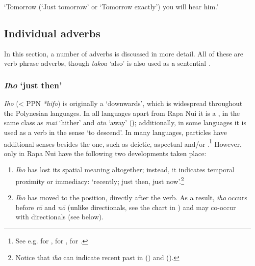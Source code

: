 \glt 
‘Tomorrow (‘Just tomorrow’ or ‘Tomorrow exactly’) you will hear him.’ \textstyleExampleref{[Act. 25:22]}
\z

\subsection{Individual adverbs}\label{sec:4.5.3}
In this section, a number of adverbs is discussed in more detail. All of these are verb phrase adverbs, though \textit{tako{\ꞌ}a} ‘also’ is also used as a sentential .

\subsubsection{\textit{Iho} ‘just then’}\label{sec:4.5.3.1}

\textit{Iho} ({\textless} PPN \textit{*hifo}) is originally a   ‘downwards’, which is widespread throughout the Polynesian languages. In all languages apart from Rapa Nui it is a , in the same class as \textit{mai} ‘hither’ and \textit{atu} ‘away’ (); additionally, in some languages it is used as a verb in the sense ‘to descend’. In many languages,  particles have additional senses besides the  one, such as deictic, aspectual and/or .\footnote{\label{fn:194}See e.g. \citet[427]{Cablitz2006} for , \citet[175, 217, 330]{AcadémieTahitienne1986} for , \citet[92–95]{ElbertPukui1979} for .} However, only in Rapa Nui have the following two developments taken place: 

\begin{enumerate}
\item 
\textit{Iho} has lost its spatial meaning altogether; instead, it indicates temporal proximity or immediacy: ‘recently; just then, just now’.\footnote{\label{fn:195}Notice that \textit{iho} can indicate recent past in  (\citealt[92]{ElbertPukui1979}) and  (\citealt[175]{AcadémieTahitienne1986}).} 

\item 
\textit{Iho} has moved to the  position, directly after the verb. As a result, \textit{iho} occurs before \textit{rō} and \textit{nō} (unlike directionals, see the chart in ) and may co-occur with directionals (see  below).

\end{enumerate}

